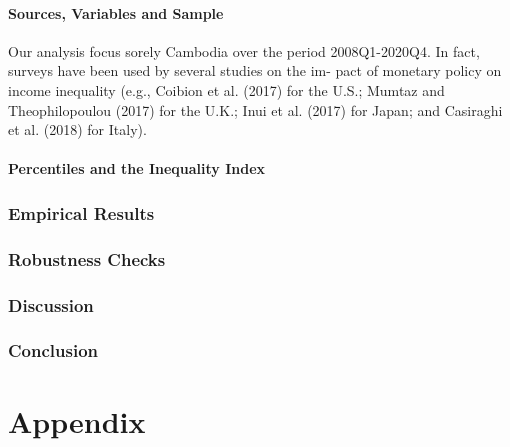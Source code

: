 \documentclass[11pt,letterpaper]{article}
\begin{document}
\subsection{Sources, Variables and Sample}	
Our analysis focus sorely Cambodia over the period 2008Q1-2020Q4. In fact, surveys have been used by several studies on the im- pact of monetary policy on income inequality (e.g., Coibion et al. (2017) for the U.S.; Mumtaz and Theophilopoulou (2017) for the U.K.; Inui et al. (2017) for Japan; and Casiraghi et al. (2018) for Italy).
\subsection{Percentiles and the Inequality Index}	


\section{Empirical Results}\label{sec:results}


\section{Robustness Checks}\label{sec:robust}


\section{Discussion}
  
\section{Conclusion}\label{sec:conclusion}

\clearpage	
{\small
	
}	
\clearpage

\appendix 
	\part*{Appendix}\label{app:dix}
	\renewcommand*{\thepage}{A\arabic{page}}
	\renewcommand{\thetable}{A\arabic{table}}
	
\end{document}
